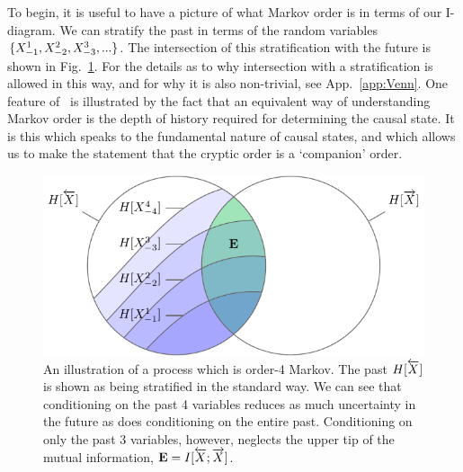 To begin, it is useful to have a picture of what Markov order is in terms of our I-diagram. We can stratify the past in terms of the random variables $\{{X}_{-1}^{1}, {X}_{-2}^{2}, {X}_{-3}^{3}, ...\}$. The intersection of this stratification with the future is shown in Fig.~\ref{fig:FoliationMarkov}. For the details as to why intersection with a stratification is allowed in this way, and for why it is also non-trivial, see App.~\ref{app:Venn}. One feature of \eMs\ is illustrated by the fact that an equivalent way of understanding Markov order is the depth of history required for determining the causal state. It is this which speaks to the fundamental nature of causal states, and which allows us to make the statement that the cryptic order is a `companion' order.

\begin{figure}[h!]
\centering
\includegraphics[scale = 1.2]{../chapter1/figures/tikz/FoliationMarkov}
\caption{An illustration of a process which is order-4 Markov. The past $H[\protect \smash{\overleftarrow {{X}}}]$ is shown as being stratified in the standard way. We can see that conditioning on the past 4 variables reduces as much uncertainty in the future as does conditioning on the entire past. Conditioning on only the past 3 variables, however, neglects the upper tip of the mutual information, ${\bf E}=I[\protect\smash{\overleftarrow {{X}}};\protect\smash{\overrightarrow{{X}}}]$.}
\label{fig:FoliationMarkov}
\end{figure}

